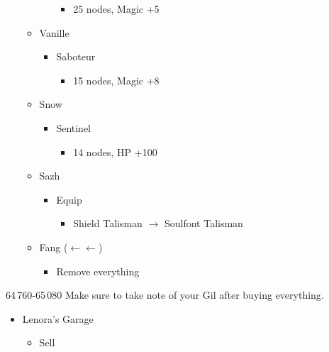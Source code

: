 \begin{paracol}{2}
\begin{menu}
\begin{itemize}
\begin{itemize}
\begin{itemize}
\begin{itemize}
						            \item 25 nodes, Magic +5
					            \end{itemize}
				      \end{itemize}
				\item Vanille
				      \begin{itemize}
					      \item Saboteur
					            \begin{itemize}
						            \item 15 nodes, Magic +8
					            \end{itemize}
				      \end{itemize}
				\item Snow
				      \begin{itemize}
					      \item Sentinel
					            \begin{itemize}
						            \item 14 nodes, HP +100
					            \end{itemize}
				      \end{itemize}
			\end{itemize}
			\equip
			\begin{itemize}
				\item Sazh
				      \begin{itemize}
					      \item Equip
					            \begin{itemize}
						            \item Shield Talisman $\rightarrow$ Soulfont Talisman
					            \end{itemize}
				      \end{itemize}
				\item Fang ($\leftarrow\leftarrow$)
				      \begin{itemize}
					      \item Remove everything
				      \end{itemize}
			\end{itemize}
		\end{itemize}
	\end{menu}
	\switchcolumn*
	\begin{shop}{64\,760-65\,080}
		Make sure to take note of your Gil after buying everything.
		\begin{itemize}
			\item Lenora's Garage
			      \begin{itemize}
				      \item Sell

\end{itemize}
\end{itemize}
\end{shop}
\end{paracol}

